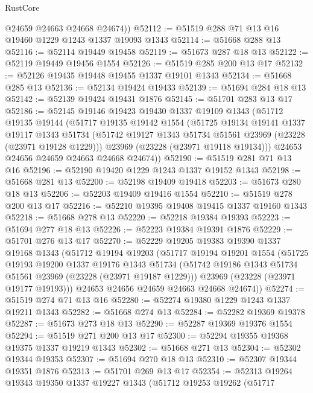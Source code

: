 \begin{lexlean}{RustCore}
\begin{coremodule}
        @24659
        @24663
        @24668
        @24674))
@52112 := @51519 @288 @71 @13 @16 @19460 @1229 @1243 @1337 @19093 @1343
@52114 := @51668 @288 @13
@52116 := @52114 @19449 @19458
@52119 := @51673 @287 @18 @13
@52122 := @52119 @19449 @19456 @1554
@52126 := @51519 @285 @200 @13 @17
@52132 := @52126 @19435 @19448 @19455 @1337 @19101 @1343
@52134 := @51668 @285 @13
@52136 := @52134 @19424 @19433
@52139 := @51694 @284 @18 @13
@52142 := @52139 @19424 @19431 @1876
@52145 := @51701 @283 @13 @17
@52186 := @52145
    @19146
    @19423
    @19430
    @1337
    @19109
    @1343
    (@51712
      @19135
      @19144
      (@51717
        @19135
        @19142
        @1554
        (@51725
          @19134
          @19141
          @1337
          @19117
          @1343
          @51734
          (@51742 @19127 @1343 @51734 @51561 @23969 (@23228 (@23971 @19128 @1229)))
          @23969
          (@23228 (@23971 @19118 @19134)))
        @24653
        @24656
        @24659
        @24663
        @24668
        @24674))
@52190 := @51519 @281 @71 @13 @16
@52196 := @52190 @19420 @1229 @1243 @1337 @19152 @1343
@52198 := @51668 @281 @13
@52200 := @52198 @19409 @19418
@52203 := @51673 @280 @18 @13
@52206 := @52203 @19409 @19416 @1554
@52210 := @51519 @278 @200 @13 @17
@52216 := @52210 @19395 @19408 @19415 @1337 @19160 @1343
@52218 := @51668 @278 @13
@52220 := @52218 @19384 @19393
@52223 := @51694 @277 @18 @13
@52226 := @52223 @19384 @19391 @1876
@52229 := @51701 @276 @13 @17
@52270 := @52229
    @19205
    @19383
    @19390
    @1337
    @19168
    @1343
    (@51712
      @19194
      @19203
      (@51717
        @19194
        @19201
        @1554
        (@51725
          @19193
          @19200
          @1337
          @19176
          @1343
          @51734
          (@51742 @19186 @1343 @51734 @51561 @23969 (@23228 (@23971 @19187 @1229)))
          @23969
          (@23228 (@23971 @19177 @19193)))
        @24653
        @24656
        @24659
        @24663
        @24668
        @24674))
@52274 := @51519 @274 @71 @13 @16
@52280 := @52274 @19380 @1229 @1243 @1337 @19211 @1343
@52282 := @51668 @274 @13
@52284 := @52282 @19369 @19378
@52287 := @51673 @273 @18 @13
@52290 := @52287 @19369 @19376 @1554
@52294 := @51519 @271 @200 @13 @17
@52300 := @52294 @19355 @19368 @19375 @1337 @19219 @1343
@52302 := @51668 @271 @13
@52304 := @52302 @19344 @19353
@52307 := @51694 @270 @18 @13
@52310 := @52307 @19344 @19351 @1876
@52313 := @51701 @269 @13 @17
@52354 := @52313
    @19264
    @19343
    @19350
    @1337
    @19227
    @1343
    (@51712
      @19253
      @19262
      (@51717

\end{coremodule}
\end{lexlean}

